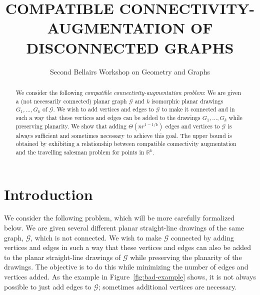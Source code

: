\documentclass{patmorin}
\title{\MakeUppercase{Compatible Connectivity-Augmentation \newline of Disconnected Graphs}}
\author{Second Bellairs Workshop on Geometry and Graphs}
\newcommand{\R}{\mathbb{R}}
\begin{document}
\begin{titlepage}

\maketitle
\begin{abstract}
\setlength{\baselineskip}{16.8pt}
We consider the following \emph{compatible connectivity-augmentation
problem}: We are given a (not necessarily connected) planar graph
$\mathcal{G}$ and $k$ isomorphic planar drawings $G_1,\ldots,G_k$ of
$\mathcal{G}$. We wish to add vertices and edges to $\mathcal{G}$ to make
it connected and in such a way that these vertices and edges can be added to
the drawings $G_1,\ldots,G_k$ while preserving planarity.  We show that
adding $\Theta(nr^{1-1/k})$ edges and vertices to $\mathcal{G}$ is always
sufficient and sometimes necessary to achieve this goal.  The upper bound
is obtained by exhibiting a relationship between compatible connectivity
augmentation and the travelling salesman problem for points in $\R^k$.
\end{abstract}

\end{titlepage}


\section{Introduction}


We consider the following problem, which will be more carefully formalized
below.  We are given several different planar straight-line drawings
of the same graph, $\mathcal G$, which is not connected.
We wish to make $\mathcal G$ connected by adding vertices and edges in
such a way that these vertices and edges can also be added to the planar
straight-line drawings of $\mathcal G$ while preserving the planarity of
the drawings.  The objective is to do this while minimizing the number
of edges and vertices added.  As the example in Figure~\ref{fig:bad-example} shows, it is not always possible to just add edges to $\mathcal G$; sometimes additional vertices are necessary.
\end{document}
